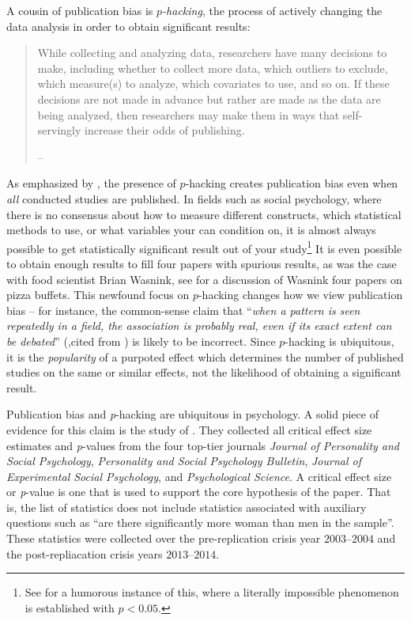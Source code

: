A cousin of publication bias is\emph{ $p$-hacking}, the process of
actively changing the data analysis in order to obtain significant
results:
\begin{quote}
While collecting and analyzing data, researchers have many decisions
to make, including whether to collect more data, which outliers to
exclude, which measure(s) to analyze, which covariates to use, and
so on. If these decisions are not made in advance but rather are made
as the data are being analyzed, then researchers may make them in
ways that self-servingly increase their odds of publishing. 
\begin{flushright}
-- \cite[p. 1]{simonsohn_p-curve:_2014}
\par\end{flushright}

\end{quote}
As emphasized by \cite{simonsohn_p-curve:_2014}, the presence of
$p$-hacking creates publication bias even when \emph{all} conducted
studies are published. In fields such as social psychology, where
there is no consensus about how to measure different constructs, which
statistical methods to use, or what variables your can condition on,
it is almost always possible to get statistically significant result
out of your study\footnote{See \cite[p. 2, study 2]{simmons_false-positive_2011} for a humorous
instance of this, where a literally impossible phenomenon is established
with $p<0.05$.} It is even possible to obtain enough results to fill four papers
with spurious results, as was the case with food scientist Brian Wasnink,
see \cite{van_der_zee_statistical_2017} for a discussion of Wasnink
four papers on pizza buffets. This newfound focus on $p$-hacking
changes how we view publication bias -- for instance, the common-sense
claim that ``\emph{when a pattern is seen repeatedly in a field,
the association is probably real, even if its exact extent can be
debated}\textquotedblright{} (\cite{ioannidis_why_2008},cited from
\cite{simonsohn_p-curve:_2014}) is likely to be incorrect. Since
$p$-hacking is ubiquitous, it is the \emph{popularity }of a purpoted
effect which determines the number of published studies on the same
or similar effects, not the likelihood of obtaining a significant
result.

Publication bias and \emph{p}-hacking are ubiquitous in psychology.
A solid piece of evidence for this claim is the study of \cite{Motyl2017-dx}.
They collected all critical effect size estimates and \emph{p}-values
from the four top-tier journals \emph{Journal of Personality and Social
Psychology}, \emph{Personality and Social Psychology Bulletin}, \emph{Journal
of Experimental Social Psychology}, and \emph{Psychological Science}.
A critical effect size or \emph{p}-value is one that is used to support
the core hypothesis of the paper. That is, the list of statistics
does not include statistics associated with auxiliary questions such
as ``are there significantly more woman than men in the sample''.
These statistics were collected over the pre-replication crisis year
$2003$--$2004$ and the post-repliacation crisis years $2013$--$2014$. 

